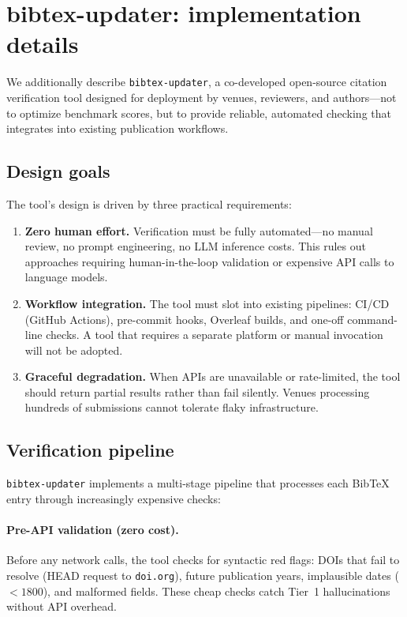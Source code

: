 \section{bibtex-updater: implementation details}
\label{app:tool}

We additionally describe \texttt{bibtex-updater}, a co-developed open-source citation verification tool designed for deployment by venues, reviewers, and authors---not to optimize benchmark scores, but to provide reliable, automated checking that integrates into existing publication workflows.

\subsection{Design goals}
\label{sec:tool_design}

The tool's design is driven by three practical requirements:
\begin{enumerate}
    \item \textbf{Zero human effort.} Verification must be fully automated---no manual review, no prompt engineering, no LLM inference costs. This rules out approaches requiring human-in-the-loop validation or expensive API calls to language models.
    \item \textbf{Workflow integration.} The tool must slot into existing pipelines: CI/CD (GitHub Actions), pre-commit hooks, Overleaf builds, and one-off command-line checks. A tool that requires a separate platform or manual invocation will not be adopted.
    \item \textbf{Graceful degradation.} When APIs are unavailable or rate-limited, the tool should return partial results rather than fail silently. Venues processing hundreds of submissions cannot tolerate flaky infrastructure.
\end{enumerate}

\subsection{Verification pipeline}
\label{sec:pipeline}

\texttt{bibtex-updater} implements a multi-stage pipeline that processes each BibTeX entry through increasingly expensive checks:

\paragraph{Pre-API validation (zero cost).}
Before any network calls, the tool checks for syntactic red flags: DOIs that fail to resolve (HEAD request to \texttt{doi.org}), future publication years, implausible dates ($< 1800$), and malformed fields. These cheap checks catch Tier~1 hallucinations without API overhead.

